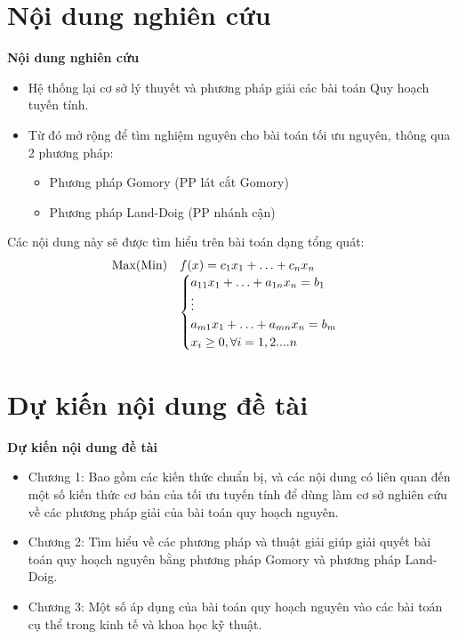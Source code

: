 \documentclass{beamer}
\begin{document}
\section{Nội dung nghiên cứu}
\begin{frame}{\bf Nội dung nghiên cứu}
    \begin{itemize}
    \item Hệ thống lại cơ sở lý thuyết và phương pháp giải các bài toán Quy hoạch tuyến tính.
    \item Từ đó mở rộng để tìm nghiệm nguyên cho bài toán tối ưu nguyên, thông qua 2 phương pháp:
    \begin{itemize}
    \item Phương pháp Gomory (PP lát cắt Gomory)
    \item Phương pháp Land-Doig (PP nhánh cận)
    \end{itemize}
    \end{itemize}
 Các nội dung này sẽ được tìm hiểu trên bài toán  dạng tổng quát:
 $$
    \begin{array}{lll}            
        {\rm Max (Min)}&f(x)=c_1x_1+\ldots+c_nx_n\\
            & \begin{cases}
            a_{11}x_1+\ldots+a_{1n}x_n =  b_1 \\
            \vdots\\
            a_{m1}x_1+\ldots+a_{mn}x_n =  b_m\\
            x_i\geq 0,\forall i=1,2....n
           \end{cases} 
     \end{array}
$$  
\end{frame}
\section{Dự kiến nội dung đề tài}
\begin{frame}{\bf Dự kiến nội dung đề tài}
    \begin{itemize}
    \item Chương 1:  Bao gồm các kiến thức chuẩn bị, và các nội dung có liên quan đến
    một số kiến thức cơ bản của tối ưu tuyến tính để dùng
    làm cơ sở nghiên cứu về các phương pháp giải của bài toán quy hoạch nguyên.
    \item Chương 2: Tìm hiểu về các phương pháp và thuật giải giúp giải quyết bài toán quy hoạch nguyên bằng phương pháp Gomory và phương pháp Land-Doig.
    \item Chương 3: Một số áp dụng của bài toán quy hoạch nguyên vào các bài toán cụ thể trong kinh tế và khoa học kỹ thuật.
    \end{itemize}   
\end{frame}
\end{document}
